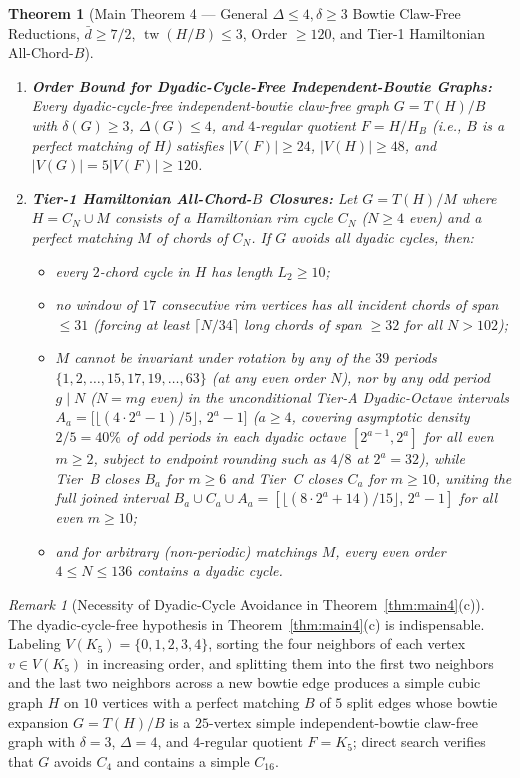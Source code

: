 \documentclass[11pt,reqno]{amsart}
\theoremstyle{plain}
\newtheorem{theorem}{Theorem}[section]
\theoremstyle{definition}
\theoremstyle{remark}
\newtheorem{remark}{Remark}[section]
\newcommand{\tw}{\operatorname{tw}}
\DeclareRobustCommand{\_}{\ifmmode\text{\textunderscore}\else\textunderscore\allowbreak\fi}
\begin{document}
\begin{theorem}[Main Theorem 4 --- General $\Delta \le 4, \delta \ge 3$ Bowtie Claw-Free Reductions, $\bar{d} \ge 7/2$, $\tw(H/B) \le 3$, Order $\ge 120$, and Tier-1 Hamiltonian All-Chord-$B$]
\begin{enumerate}[label=(\alph*),leftmargin=2.2em]
  \item \textbf{Order Bound for Dyadic-Cycle-Free Independent-Bowtie Graphs:} Every \emph{dyadic-cycle-free} independent-bowtie claw-free graph $G = T(H)/B$ with $\delta(G) \ge 3$, $\Delta(G) \le 4$, and $4$-regular quotient $F = H/H_B$ (i.e., $B$ is a perfect matching of $H$) satisfies $|V(F)| \ge 24$, $|V(H)| \ge 48$, and $|V(G)| = 5|V(F)| \ge 120$.
  \item \textbf{Tier-1 Hamiltonian All-Chord-$B$ Closures:} Let $G = T(H)/M$ where $H = C_N \cup M$ consists of a Hamiltonian rim cycle $C_N$ ($N \ge 4$ even) and a perfect matching $M$ of chords of $C_N$. If $G$ avoids all dyadic cycles, then:
  \begin{itemize}[leftmargin=1.6em]
    \item every $2$-chord cycle in $H$ has length $L_2 \ge 10$;
    \item no window of $17$ consecutive rim vertices has all incident chords of span $\le 31$ (forcing at least $\lceil N/34 \rceil$ long chords of span $\ge 32$ for all $N > 102$);
    \item $M$ cannot be invariant under rotation by any of the $39$ periods $\{1, 2, \dots, 15, 17, 19, \dots, 63\}$ (at any even order $N$), nor by any odd period $g \mid N$ ($N = m g$ even) in the unconditional Tier-A Dyadic-Octave intervals $A_a = \bigl[\lfloor(4 \cdot 2^a - 1)/5\rfloor,\, 2^a - 1\bigr]$ ($a \ge 4$, covering asymptotic density $2/5 = 40\%$ of odd periods in each dyadic octave $[2^{a-1}, 2^a]$ for all even $m \ge 2$, subject to endpoint rounding such as $4/8$ at $2^a = 32$), while Tier~B closes $B_a$ for $m \ge 6$ and Tier~C closes $C_a$ for $m \ge 10$, uniting the full joined interval $B_a \cup C_a \cup A_a = [\lfloor(8 \cdot 2^a + 14)/15\rfloor,\, 2^a - 1]$ for all even $m \ge 10$;
    \item and for arbitrary (non-periodic) matchings $M$, every even order $4 \le N \le 136$ contains a dyadic cycle.
  \end{itemize}
\end{enumerate}
\end{theorem}

\begin{remark}[Necessity of Dyadic-Cycle Avoidance in Theorem~\ref{thm:main4}(c)]\label{rem:k5-25}
The dyadic-cycle-free hypothesis in Theorem~\ref{thm:main4}(c) is indispensable. Labeling $V(K_5) = \{0, 1, 2, 3, 4\}$, sorting the four neighbors of each vertex $v \in V(K_5)$ in increasing order, and splitting them into the first two neighbors and the last two neighbors across a new bowtie edge produces a simple cubic graph $H$ on $10$ vertices with a perfect matching $B$ of $5$ split edges whose bowtie expansion $G = T(H)/B$ is a $25$-vertex simple independent-bowtie claw-free graph with $\delta = 3$, $\Delta = 4$, and $4$-regular quotient $F = K_5$; direct search verifies that $G$ avoids $C_4$ and contains a simple $C_{16}$.
\end{remark}
\end{document}
